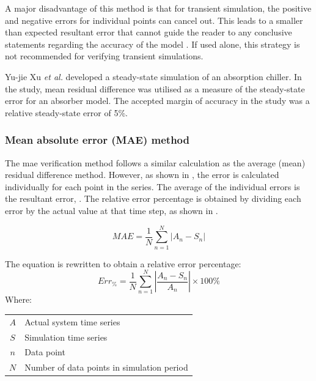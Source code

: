 			A major disadvantage of this method is that for transient simulation, the positive and negative errors for individual points can cancel out. This leads to a smaller than expected resultant error that cannot guide the reader to any conclusive statements regarding the accuracy of the model \cite{sarin2010comparing}. If used alone, this strategy is not recommended for verifying transient simulations. 
 			\par 
 						
 			Yu-jie Xu \textit{et al.} \cite{xu2016modeling} developed a steady-state simulation of an absorption chiller. In the study, mean residual difference was utilised as a measure of the steady-state error for an absorber model. The accepted margin of accuracy in the study was a relative steady-state error of 5\%. 
 			
 		\subsubsection{Mean absolute error (MAE) method}
 		The \gls{mae} verification method follows a similar calculation as the average (mean) residual difference method. However, as shown in , the error is calculated individually for each point in the series. The average of the individual errors is the resultant error, . The relative error percentage is obtained by dividing each error by the actual value at that time step, as shown in .
 		\par
 		\begin{equation}
 		\label{eq: Relative error 2}
 		MAE = \dfrac{1}{N}\sum_{n=1}^{N}{\left|A_{n} - S_{n}\right| }
 		\end{equation}
 		
 			The equation is rewritten to obtain a relative error percentage:	
 			\begin{equation}
 			\label{eq: Relative error}
 			Err_{\%} = \dfrac{1}{N}\sum_{n=1}^{N}{\left|\dfrac{A_{n} - S_{n}}{A_{n}}\right| }\times 100 \%
 			\end{equation}
 			Where: \par
 			\begin{table}[!htbp]
 				\centering
 				\begin{tabular}{cl}
 					$A$ & Actual system time series \\
 					$S$ & Simulation time series \\
 					$n$ & Data point \\
 					$N$ & Number of data points in simulation period \\
 				\end{tabular} 
 			\end{table} 
